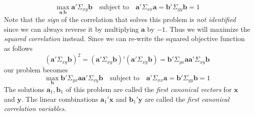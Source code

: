 \documentclass[12pt]{article}
\theoremstyle{definition}
\begin{document}
$$\max_{\textbf{a}, \textbf{b}} \textbf{a}'\Sigma_{xy}\textbf{b} \quad \mbox{subject to} \quad \textbf{a}'\Sigma_{xx}\textbf{a} = \textbf{b}' \Sigma_{yy} \textbf{b} = 1$$
Note that the \emph{sign} of the correlation that solves this problem is \emph{not identified} since we can always reverse it by multiplying $\mathbf{a}$ by $-1$. Thus we will maximize the \emph{squared correlation} instead. Since we can re-write the squared objective function as follows
$$ \left(\textbf{a}'\Sigma_{xy}\textbf{b}\right)^2  =  \left(\textbf{a}'\Sigma_{xy}\textbf{b}\right)'  \left(\textbf{a}'\Sigma_{xy}\textbf{b}\right) = \textbf{b}' \Sigma_{yx} \textbf{a}\textbf{a}' \Sigma_{xy}\textbf{b}$$
our problem becomes
$$\max_{\textbf{b}} \textbf{b}' \Sigma_{yx} \textbf{a}\textbf{a}' \Sigma_{xy}\textbf{b} \quad \mbox{subject to} \quad  \textbf{a}'\Sigma_{xx}\textbf{a} = \textbf{b}' \Sigma_{yy} \textbf{b} = 1$$
The solutions $\mathbf{a}_1, \mathbf{b}_1$ of this problem are called the \emph{first canonical vectors} for $\mathbf{x}$ and $\mathbf{y}$. The linear combinations $\mathbf{a}_1' \mathbf{x}$ and $\mathbf{b}_1' \mathbf{y}$ are called the \emph{first canonical correlation variables}.
\end{document}
